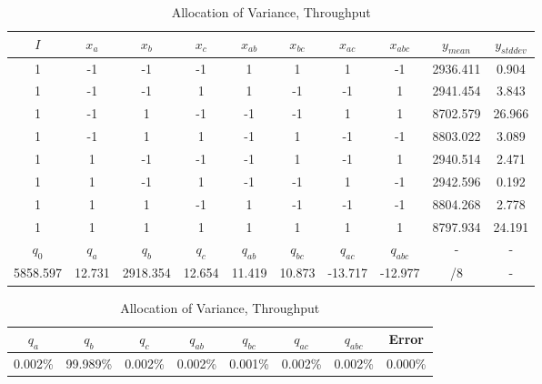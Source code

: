 \documentclass[11pt,a4paper]{article}
\begin{document}
\begin{table}
    \begin{subtable}{1.0\linewidth}\centering
        {\begin{tabular}{|cccccccc|cc|}
            \hline
            $I$ & $x_a$ & $x_b$ & $x_c$ & $x_{ab}$ & $x_{bc}$ & $x_{ac}$ & $x_{abc}$ & $y_{mean}$ & $y_{stddev}$\\
            \hline
                    1 &     -1 &       -1 &     -1 &      1 &      1 &       1 &      -1 & 2936.411 &   0.904 \\
                    1 &     -1 &       -1 &      1 &      1 &     -1 &      -1 &       1 & 2941.454 &   3.843 \\
                    1 &     -1 &        1 &     -1 &     -1 &     -1 &       1 &       1 & 8702.579 &  26.966 \\
                    1 &     -1 &        1 &      1 &     -1 &      1 &      -1 &      -1 & 8803.022 &   3.089 \\
                    1 &      1 &       -1 &     -1 &     -1 &      1 &      -1 &       1 & 2940.514 &   2.471 \\
                    1 &      1 &       -1 &      1 &     -1 &     -1 &       1 &      -1 & 2942.596 &   0.192 \\
                    1 &      1 &        1 &     -1 &      1 &     -1 &      -1 &      -1 & 8804.268 &   2.778 \\
                    1 &      1 &        1 &      1 &      1 &      1 &       1 &       1 & 8797.934 &  24.191 \\
            \hline
            $q_0$ & $q_a$ & $q_b$ & $q_c$ & $q_{ab}$ & $q_{bc}$ & $q_{ac}$ & $q_{abc}$ & - & -\\
              5858.597 & 12.731 & 2918.354 & 12.654 & 11.419 & 10.873 & -13.717 & -12.977 & /8 & - \\
            \hline
        \end{tabular}
        \caption{Parameters and Effect Sizes, Throughput}}
    \end{subtable}
    \begin{subtable}{1.0\linewidth}\centering
        {\begin{tabular}{|cccccccc|}
            \hline
            $q_a$ & $q_b$ & $q_c$ & $q_{ab}$ & $q_{bc}$ & $q_{ac}$ & $q_{abc}$ & Error \\
            \hline
            0.002\% & 99.989\% & 0.002\% & 0.002\%   &  0.001\%   &   0.002\%  &   0.002\%   & 0.000\% \\
            \hline
        \end{tabular}
        \caption{Allocation of Variance, Throughput}}
    \end{subtable}


\end{table}
\end{document}
